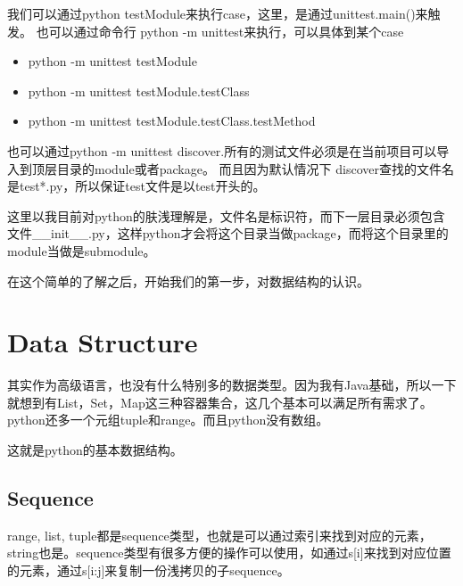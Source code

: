 我们可以通过python testModule来执行case，这里，是通过unittest.main()来触发。
也可以通过命令行 python -m unittest来执行，可以具体到某个case
\begin{itemize}
\item python -m unittest testModule
\item python -m unittest testModule.testClass
\item python -m unittest testModule.testClass.testMethod
\end{itemize}

也可以通过python -m unittest discover.所有的测试文件必须是在当前项目可以导入到顶层目录的module或者package。
而且因为默认情况下 discover查找的文件名是test*.py，所以保证test文件是以test开头的。

这里以我目前对python的肤浅理解是，文件名是标识符，而下一层目录必须包含文件\_\_init\_\_.py，这样python才会将这个目录当做package，而将这个目录里的module当做是submodule。

在这个简单的了解之后，开始我们的第一步，对数据结构的认识。


\section{Data Structure}
其实作为高级语言，也没有什么特别多的数据类型。因为我有Java基础，所以一下就想到有List，Set，Map这三种容器集合，这几个基本可以满足所有需求了。python还多一个元组tuple和range。而且python没有数组。

这就是python的基本数据结构。

\subsection{Sequence}
range, list, tuple都是sequence类型，也就是可以通过索引来找到对应的元素，string也是。sequence类型有很多方便的操作可以使用，如通过s[i]来找到对应位置的元素，通过s[i:j]来复制一份浅拷贝的子sequence。

